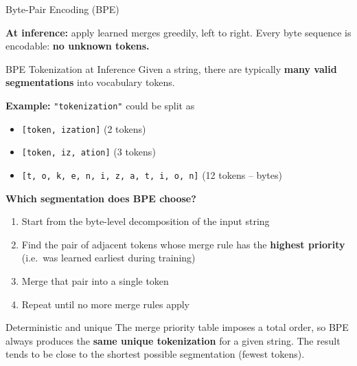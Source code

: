 \begin{frame}{Byte-Pair Encoding (BPE)}

  \vspace{0.2em}
  \raggedright
  \textbf{At inference:} apply learned merges greedily, left to right. Every byte sequence is encodable: \textbf{no unknown tokens.}
\end{frame}

\begin{frame}{BPE Tokenization at Inference}
  Given a string, there are typically \textbf{many valid segmentations} into vocabulary tokens.

  \vspace{0.3em}
  \textbf{Example:} \texttt{"tokenization"} could be split as
  \begin{itemize}
    \item \texttt{[token, ization]} \quad (2 tokens)
    \item \texttt{[token, iz, ation]} \quad (3 tokens)
    \item \texttt{[t, o, k, e, n, i, z, a, t, i, o, n]} \quad (12 tokens -- bytes)
  \end{itemize}

  \vspace{0.3em}
  \textbf{Which segmentation does BPE choose?}
  \begin{enumerate}
    \item Start from the byte-level decomposition of the input string
    \item Find the pair of adjacent tokens whose merge rule has the \textbf{highest priority} (i.e.\ was learned earliest during training)
    \item Merge that pair into a single token
    \item Repeat until no more merge rules apply
  \end{enumerate}

  \begin{block}{Deterministic and unique}
    The merge priority table imposes a total order, so BPE always produces the \textbf{same unique tokenization} for a given string.
    The result tends to be close to the shortest possible segmentation (fewest tokens).
  \end{block}
\end{frame}

